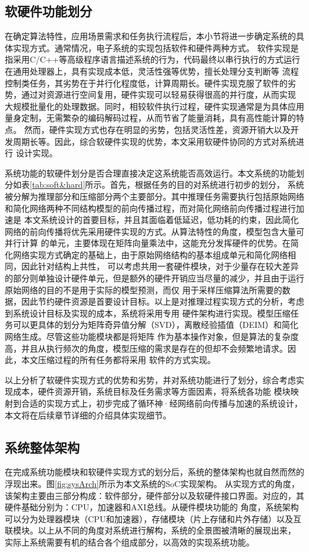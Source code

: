 \subsection{软硬件功能划分}
在确定算法特性，应用场景需求和任务执行流程后，本小节将进一步确定系统的具体实现方式。通常情况，电子系统的实现包括软件和硬件两种方式。
软件实现是指采用C/C++等高级程序语言描述系统的行为，代码最终以串行执行的方式运行在通用处理器上，具有实现成本低，灵活性强等优势，擅长处理分支判断等
流程控制类任务，其劣势在于并行化程度低，计算周期长。硬件实现克服了软件的劣势，通过对资源进行空间复用，硬件实现可以轻易获得很高的并行度，从而实现
大规模批量化的处理数据。同时，相较软件执行过程，硬件实现通常是为具体应用量身定制，无需繁杂的编码解码过程，从而节省了能量消耗，具有高性能计算的特点。
然而，硬件实现方式也存在明显的劣势，包括灵活性差，资源开销大以及开发周期长等。因此，综合软硬件实现的优势，本文采用软硬件协同的方式对系统进行
设计实现。

系统功能的软硬件划分是否合理直接决定这系统能否高效运行。本文系统的功能划分如表\ref{tab:soft&hard}所示。首先，根据任务的目的对系统进行初步的划分，
系统被分解为推理部分和压缩部分两个主要部分。其中推理任务需要执行包括原始网络和简化网络两种不同结构模型的前向传播过程，而对简化网络前向传播过程进行加速是
本文系统设计的首要目标，并且其面临着低延迟，低功耗的约束，因此简化网络的前向传播将优先采用硬件实现的方式。从算法特性的角度，模型包含大量可并行计算
的单元，主要体现在矩阵向量乘法中，这能充分发挥硬件的优势。在简化网络实现方式确定的基础上，由于原始网络结构的基本组成单元和简化网络相同，因此针对结构上共性，
可以考虑共用一套硬件模块，对于少量存在较大差异的部分则单独设计硬件单元，但是额外的硬件开销应当尽量的减少，并且由于运行原始网络的目的不是用于实际的模型预测，而仅
用于采样压缩算法所需要的数据，因此节约硬件资源是首要设计目标。以上是对推理过程实现方式的分析，考虑到系统设计目标及实现的成本，系统将采用专用
硬件架构进行实现。模型压缩任务可以更具体的划分为矩阵奇异值分解（SVD），离散经验插值（DEIM）和简化网络生成。尽管这些功能模块都是将矩阵
作为基本操作对象，但是算法的复杂度高，并且从执行频次的角度，模型压缩的需求是存在的但却不会频繁地请求。因此，本文压缩过程的所有任务都将采用
软件的方式实现。


以上分析了软硬件实现方式的优势和劣势，并对系统功能进行了划分，综合考虑实现成本，硬件资源开销，系统目标及任务需求等方面因素，将系统各功能
模块映射到合适的实现方式上，初步完成了循环神·经网络前向传播与加速的系统设计，本文将在后续章节详细的介绍具体实现细节。
\subsection{系统整体架构}
在完成系统功能模块和软硬件实现方式的划分后，系统的整体架构也就自然而然的浮现出来。图\ref{fig:sysArch}所示为本文系统的SoC实现架构。
从实现方式的角度，该架构主要由三部分构成：软件部分，硬件部分以及软硬件接口界面。对应的，其硬件基础分别为：CPU，加速器和AXI总线。从硬件模块功能的
角度，系统架构可以分为处理器模块（CPU和加速器），存储模块（片上存储和片外存储）以及互联模块。以上从不同的角度对系统进行解构，系统的全景图被清晰的展现出来，
实际上系统需要有机的结合各个组成部分，以高效的实现系统功能。

